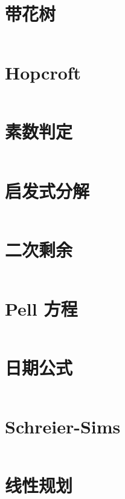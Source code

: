 \documentclass[titlepage,landscape,a4paper,10pt]{article}
\begin{document}
\begin{multicols}{2}
\begin{spacing}{0.8}
\section{带花树}
\inputminted{cpp}{src/带花树.cpp}


\section{Hopcroft}
\inputminted{cpp}{src/Hopcroft.cpp}

\section{素数判定}
\inputminted{cpp}{src/素数判定.cpp}

\section{启发式分解}
\inputminted{cpp}{src/启发式分解.cpp}

\section{二次剩余}
\inputminted{cpp}{src/二次剩余.cpp}

\section{Pell 方程}
\inputminted{cpp}{src/Pell方程.cpp}

\section{日期公式}
\inputminted{cpp}{improve/日期公式.cpp}

\section{Schreier-Sims}
\inputminted{cpp}{improve/SchreierSims.cpp}


\section{线性规划}
\inputminted{cpp}{src/线性规划.cpp}


\end{spacing}
\end{multicols}
\end{document}
